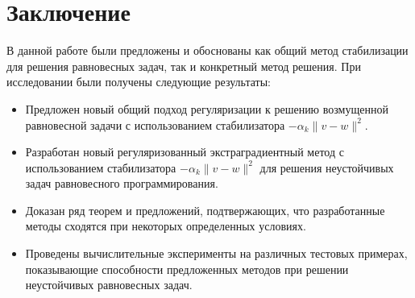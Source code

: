 {}
\section*{Заключение}
В данной работе были предложены и обоснованы как общий метод стабилизации для решения равновесных задач, так и конкретный метод решения. При исследовании были получены следующие результаты:
\begin{itemize}
	\item Предложен новый общий подход регуляризации к решению возмущенной равновесной задачи с использованием стабилизатора $-\alpha_k\|v-w\|^2$.
	\item Разработан новый регуляризованный экстраградиентный метод с использованием стабилизатора $-\alpha_k\|v-w\|^2$ для решения неустойчивых задач равновесного программирования.
	\item Доказан ряд теорем и предложений, подтвержающих, что разработанные методы сходятся при некоторых определенных условиях. 
	\item Проведены вычислительные эксперименты на различных тестовых примерах, показывающие способности предложенных методов при решении неустойчивых равновесных задач. 
	
\end{itemize}
	
\clearpage

